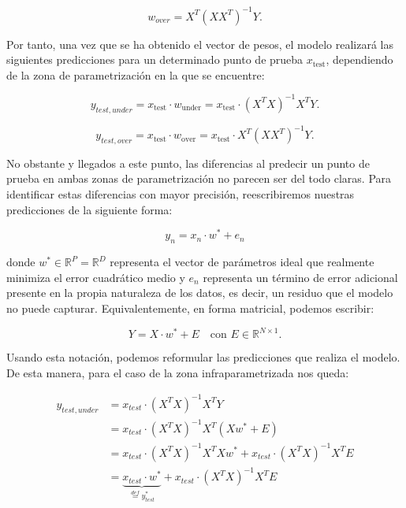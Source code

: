 \begin{equation}
    w_{over} = X^{T}{(XX^{T})}^{-1}Y.
\end{equation}\newline

Por tanto, una vez que se ha obtenido el vector de pesos, el modelo realizará las siguientes predicciones para un determinado punto de prueba $x_{\text{test}}$, dependiendo de la zona de parametrización en la que se encuentre:

\begin{equation}
    y_{test, under} = x_{\text{test}} \cdot w_{\text{under}} = x_{\text{test}} \cdot {(X^{T}X)}^{-1}X^{T}Y.
\end{equation}

\begin{equation}
    y_{test, over} = x_{\text{test}} \cdot w_{\text{over}} = x_{\text{test}} \cdot X^{T}{(XX^{T})}^{-1}Y.
\end{equation}\newline

No obstante y llegados a este punto, las diferencias al predecir un punto de prueba en ambas zonas de parametrización no parecen ser del todo claras. Para identificar estas diferencias con mayor precisión, reescribiremos nuestras predicciones de la siguiente forma:

\[
    y_n = x_n \cdot w^{*} + e_n
\]

donde $w^{*} \in \mathbb{R}^{P} = \mathbb{R}^{D}$ representa el vector de parámetros ideal que realmente minimiza el error cuadrático medio y $e_n$ representa un término de error adicional presente en la propia naturaleza de los datos, es decir, un residuo que el modelo no puede capturar. Equivalentemente, en forma matricial, podemos escribir:

\[
    Y = X \cdot w^{*} + E \quad \text{con } E \in \mathbb{R}^{N \times 1}.
\]\newline

Usando esta notación, podemos reformular las predicciones que realiza el modelo. De esta manera, para el caso de la zona infraparametrizada nos queda:

\begin{align}
    y_{test, under} &= x_{test} \cdot {(X^T X)}^{-1} X^T Y \\
    &= x_{test} \cdot {(X^T X)}^{-1} X^T (X w^{*} + E) \\
    &= x_{test} \cdot {(X^T X)}^{-1} X^T X w^{*} + x_{test} \cdot {(X^T X)}^{-1} X^T E \\
    &= \underbrace{x_{test} \cdot w^{*}}_{\overset{def}{=} y^*_{test}} + x_{test} \cdot {(X^T X)}^{-1} X^T E
\end{align}

